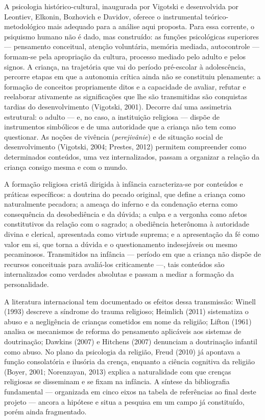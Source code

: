 \documentclass[
    a4paper,
    12pt,
    oneside,
    section=TITLE,
    brazilian,
    english
]{abntex2}
\begin{document}
A psicologia histórico-cultural, inaugurada por Vigotski e desenvolvida por Leontiev, Elkonin, Bozhovich e Davidov, oferece o instrumental teórico-metodológico mais adequado para a análise aqui proposta. Para essa corrente, o psiquismo humano não é dado, mas construído: as funções psicológicas superiores --- pensamento conceitual, atenção voluntária, memória mediada, autocontrole --- formam-se pela apropriação da cultura, processo mediado pelo adulto e pelos signos. A criança, na trajetória que vai do período pré-escolar à adolescência, percorre etapas em que a autonomia crítica ainda não se constituiu plenamente: a formação de conceitos propriamente ditos e a capacidade de avaliar, refutar e reelaborar ativamente as significações que lhe são transmitidas são conquistas tardias do desenvolvimento (Vigotski, 2001). Decorre daí uma assimetria estrutural: o adulto --- e, no caso, a instituição religiosa --- dispõe de instrumentos simbólicos e de uma autoridade que a criança não tem como questionar. As noções de vivência (\emph{perejivânie}) e de situação social de desenvolvimento (Vigotski, 2004; Prestes, 2012) permitem compreender como determinados conteúdos, uma vez internalizados, passam a organizar a relação da criança consigo mesma e com o mundo.

A formação religiosa cristã dirigida à infância caracteriza-se por conteúdos e práticas específicos: a doutrina do pecado original, que define a criança como naturalmente pecadora; a ameaça do inferno e da condenação eterna como consequência da desobediência e da dúvida; a culpa e a vergonha como afetos constitutivos da relação com o sagrado; a obediência heterônoma à autoridade divina e clerical, apresentada como virtude suprema; e a apresentação da fé como valor em si, que torna a dúvida e o questionamento indesejáveis ou mesmo pecaminosos. Transmitidos na infância --- período em que a criança não dispõe de recursos conceituais para avaliá-los criticamente ---, tais conteúdos são internalizados como verdades absolutas e passam a mediar a formação da personalidade.

A literatura internacional tem documentado os efeitos dessa transmissão: Winell (1993) descreve a síndrome do trauma religioso; Heimlich (2011) sistematiza o abuso e a negligência de crianças cometidos em nome da religião; Lifton (1961) analisa os mecanismos de reforma do pensamento aplicáveis aos sistemas de doutrinação; Dawkins (2007) e Hitchens (2007) denunciam a doutrinação infantil como abuso. No plano da psicologia da religião, Freud (2010) já apontava a função consolatória e ilusória da crença, enquanto a ciência cognitiva da religião (Boyer, 2001; Norenzayan, 2013) explica a naturalidade com que crenças religiosas se disseminam e se fixam na infância. A síntese da bibliografia fundamental --- organizada em cinco eixos na tabela de referências ao final deste projeto --- ancora a hipótese e situa a pesquisa em um campo já constituído, porém ainda fragmentado.
\end{document}
